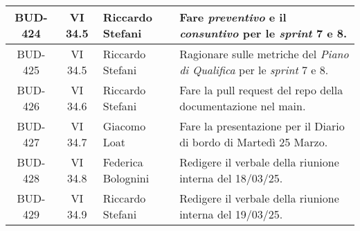\begin{table}[htbp]
\begin{tabular}{|c|c|p{}|p{}|}
    \hline
    BUD-424 & VI 34.5 & Riccardo Stefani & Fare \emph{preventivo} e il \emph{consuntivo} per le \emph{sprint} 7 e 8. \\
    \hline
    BUD-425 & VI 34.5 & Riccardo Stefani & Ragionare sulle metriche del \emph{Piano di Qualifica} per le \emph{sprint} 7 e 8.\\
    \hline
    BUD-426 & VI 34.6 & Riccardo Stefani & Fare la pull request del repo della documentazione nel main. \\
    \hline
    BUD-427 & VI 34.7 & Giacomo Loat & Fare la presentazione per il Diario di bordo di Martedì 25 Marzo. \\
    \hline
    BUD-428 & VI 34.8 & Federica Bolognini & Redigere il verbale della riunione interna del 18/03/25.  \\
    \hline
    BUD-429 & VI 34.9 & Riccardo Stefani & Redigere il verbale della riunione interna del 19/03/25.  \\
    \hline
\end{tabular}
\end{table}
